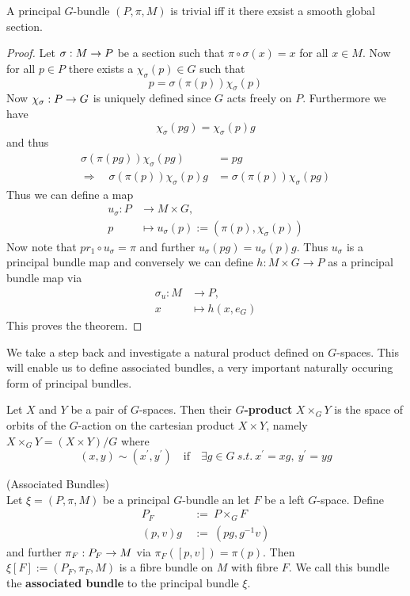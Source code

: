 \begin{theo}
  A principal $G$-bundle $(P,\pi,M)$ is trivial iff it there exsist a smooth global section.

\begin{proof}
  Let $\sigma:M\rightarrow P$ be a section such that $\pi \circ \sigma(x) = x$ for all $x \in M$. Now for all $p\in P$ there exists a $\chi_\sigma(p) \in G$ such that
  $$ p = \sigma(\pi(p)) \chi_\sigma(p) $$
  Now $\chi_\sigma : P \rightarrow G$ is uniquely defined since $G$ acts freely on $P$. Furthermore we have
  $$ \chi_\sigma (pg) = \chi_\sigma(p) g $$
  and thus
  \begin{align*}
    \sigma(\pi(pg)) \chi_\sigma(pg) &= pg \\
    \Rightarrow \quad \sigma(\pi(p)) \chi_\sigma(p) g &= \sigma(\pi(p)) \chi_\sigma(pg)
  \end{align*}
  Thus we can define a map
  \begin{align*}
    u_\sigma : P &\longrightarrow M\times G,\\
    p &\longmapsto u_\sigma(p) := (\pi(p), \chi_\sigma(p))
  \end{align*}
  Now note that $pr_1 \circ u_\sigma = \pi$ and further $u_\sigma(pg) = u_\sigma(p)g$. Thus $u_\sigma$ is a principal bundle map and conversely we can define $h: M\times G \longrightarrow P$ as a principal bundle map via
  \begin{align*}
    \sigma_u : M &\longrightarrow P,\\
    x &\longmapsto h(x, e_G)
  \end{align*}
  This proves the theorem. %
\end{proof}
\end{theo}


We take a step back and investigate a natural product defined on $G$-spaces. This will enable us to define associated bundles, a very important naturally occuring form of principal bundles.

\begin{definition}
  Let $X$ and $Y$ be a pair of $G$-spaces. Then their \textbf{$G$-product} $X \times_G Y$ is the space of orbits of the $G$-action on the cartesian product $X\times Y$, namely $X\times_G Y = (X\times Y)/G$ where
  $$ (x,y) \sim (x^\prime, y^\prime) \quad \text{if} \quad \exists g\in G\  s.t. \ x^\prime = xg, \ y^\prime = yg $$
\end{definition}

\begin{definition} (Associated Bundles)\\
  Let $\xi = (P, \pi, M)$ be a principal $G$-bundle an let $F$ be a left $G$-space. Define
  \begin{align*}
    P_F \ &:= \ P \times_G F\\
    (p,v)g \ &:= \ (pg, g^{-1}v)
  \end{align*}
  and further $\pi_F: P_F \rightarrow M$ via $\pi_F([p,v]) = \pi(p)$. Then $\xi[F]:= (P_F, \pi_F, M)$ is a fibre bundle on $M$ with fibre $F$. We call this bundle the \textbf{associated bundle} to the principal bundle $\xi$.
\end{definition}

